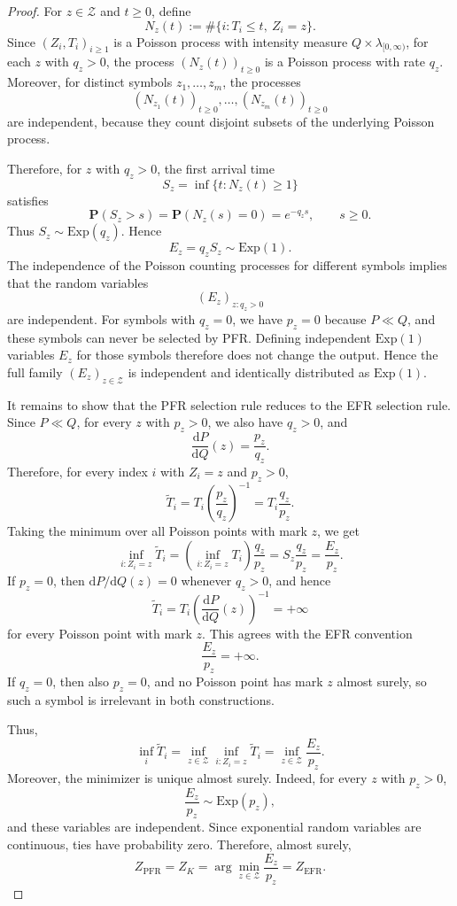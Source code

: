 \documentclass{article}
\theoremstyle{plain}
\theoremstyle{definition}
\begin{document}
\begin{proof}
For $z\in\mathcal{Z}$ and $t\geq 0$, define
\[
    N_z(t):=\#\{i:T_i\leq t,\ Z_i=z\}.
\]
Since $(Z_i,T_i)_{i\geq 1}$ is a Poisson process with intensity measure
$Q\times\lambda_{[0,\infty)}$, for each $z$ with $q_z>0$, the process
$(N_z(t))_{t\geq 0}$ is a Poisson process with rate $q_z$. Moreover, for distinct symbols
$z_1,\ldots,z_m$, the processes
\[
    (N_{z_1}(t))_{t\geq 0},\ldots,(N_{z_m}(t))_{t\geq 0}
\]
are independent, because they count disjoint subsets of the underlying Poisson process.

Therefore, for $z$ with $q_z>0$, the first arrival time
\[
    S_z=\inf\{t:N_z(t)\geq 1\}
\]
satisfies
\[
    \mathbf{P}(S_z>s)
    =
    \mathbf{P}(N_z(s)=0)
    =
    e^{-q_z s},
    \qquad s\geq 0.
\]
Thus $S_z\sim\mathrm{Exp}(q_z)$. Hence
\[
    E_z=q_z S_z\sim \mathrm{Exp}(1).
\]
The independence of the Poisson counting processes for different symbols implies that the random variables
\[
    (E_z)_{z:q_z>0}
\]
are independent. For symbols with $q_z=0$, we have $p_z=0$ because $P\ll Q$, and these symbols can never be selected by PFR. Defining independent $\mathrm{Exp}(1)$ variables $E_z$ for those symbols therefore does not change the output. Hence the full family $(E_z)_{z\in\mathcal{Z}}$ is independent and identically distributed as $\mathrm{Exp}(1)$.

It remains to show that the PFR selection rule reduces to the EFR selection rule. Since $P\ll Q$, for every $z$ with $p_z>0$, we also have $q_z>0$, and
\[
    \frac{\mathrm{d}P}{\mathrm{d}Q}(z)
    =
    \frac{p_z}{q_z}.
\]
Therefore, for every index $i$ with $Z_i=z$ and $p_z>0$,
\[
    \tilde T_i
    =
    T_i\left(\frac{p_z}{q_z}\right)^{-1}
    =
    T_i\frac{q_z}{p_z}.
\]
Taking the minimum over all Poisson points with mark $z$, we get
\[
    \inf_{i:Z_i=z}\tilde T_i
    =
    \left(\inf_{i:Z_i=z} T_i\right)\frac{q_z}{p_z}
    =
    S_z\frac{q_z}{p_z}
    =
    \frac{E_z}{p_z}.
\]
If $p_z=0$, then $\mathrm{d}P/\mathrm{d}Q(z)=0$ whenever $q_z>0$, and hence
\[
    \tilde T_i
    =
    T_i\left(\frac{\mathrm{d}P}{\mathrm{d}Q}(z)\right)^{-1}
    =
    +\infty
\]
for every Poisson point with mark $z$. This agrees with the EFR convention
\[
    \frac{E_z}{p_z}=+\infty .
\]
If $q_z=0$, then also $p_z=0$, and no Poisson point has mark $z$ almost surely, so such a symbol is irrelevant in both constructions.

Thus,
\[
    \inf_i \tilde T_i
    =
    \inf_{z\in\mathcal{Z}}\inf_{i:Z_i=z}\tilde T_i
    =
    \inf_{z\in\mathcal{Z}}\frac{E_z}{p_z}.
\]
Moreover, the minimizer is unique almost surely. Indeed, for every $z$ with $p_z>0$,
\[
    \frac{E_z}{p_z}\sim \mathrm{Exp}(p_z),
\]
and these variables are independent. Since exponential random variables are continuous, ties have probability zero. Therefore, almost surely, 
\[
    Z_{\mathrm{PFR}}
    =
    Z_K
    =
    \arg\min_{z\in\mathcal{Z}}\frac{E_z}{p_z}
    =
    Z_{\mathrm{EFR}}.  
\]
\end{proof}
\end{document}
